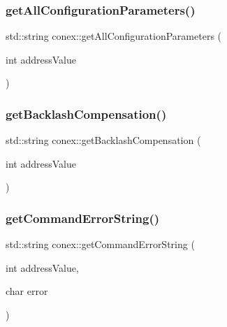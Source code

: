 \subsubsection{\texorpdfstring{get\+All\+Configuration\+Parameters()}{getAllConfigurationParameters()}}
{\footnotesize\ttfamily std\+::string conex\+::get\+All\+Configuration\+Parameters (\begin{DoxyParamCaption}\item[{int}]{address\+Value }\end{DoxyParamCaption})}

\mbox{\label{namespaceconex_a8c9d7fa13308de3bfa68ea372986d490}} 
\subsubsection{\texorpdfstring{get\+Backlash\+Compensation()}{getBacklashCompensation()}}
{\footnotesize\ttfamily std\+::string conex\+::get\+Backlash\+Compensation (\begin{DoxyParamCaption}\item[{int}]{address\+Value }\end{DoxyParamCaption})}

\mbox{\label{namespaceconex_a09ba026f23e2caeb631a18230bcd8b45}} 
\subsubsection{\texorpdfstring{get\+Command\+Error\+String()}{getCommandErrorString()}}
{\footnotesize\ttfamily std\+::string conex\+::get\+Command\+Error\+String (\begin{DoxyParamCaption}\item[{int}]{address\+Value,  }\item[{char}]{error }\end{DoxyParamCaption})}

\mbox{\label{namespaceconex_a0eb1fa3646288f0387cb303f0d8f71df}} 
